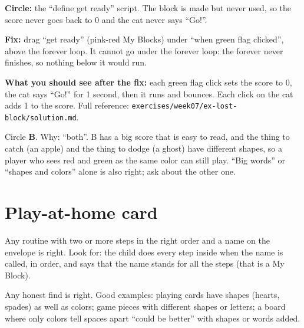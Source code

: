 \begin{answer}
\textbf{Circle:} the \enquote{define get ready} script. The block is made but never used, so the score never goes back to 0 and the cat never says \enquote{Go!}.

\textbf{Fix:} drag \enquote{get ready} (pink-red My Blocks) under \enquote{when green flag clicked}, above the forever loop. It cannot go under the forever loop: the forever never finishes, so nothing below it would run.

\textbf{What you should see after the fix:} each green flag click sets the score to 0, the cat says \enquote{Go!} for 1 second, then it runs and bounces. Each click on the cat adds 1 to the score. Full reference: \texttt{exercises/week07/ex-lost-block/solution.md}.
\end{answer}

\begin{answer}
Circle \textbf{B}. Why: \enquote{both}. B has a big score that is easy to read, and the thing to catch (an apple) and the thing to dodge (a ghost) have different shapes, so a player who sees red and green as the same color can still play. \enquote{Big words} or \enquote{shapes and colors} alone is also right; ask about the other one.
\end{answer}

\section{Play-at-home card}
\begin{answer}
Any routine with two or more steps in the right order and a name on the envelope is right. Look for: the child does every step inside when the name is called, in order, and says that the name stands for all the steps (that is a My Block).
\end{answer}

\begin{answer}
Any honest find is right. Good examples: playing cards have shapes (hearts, spades) as well as colors; game pieces with different shapes or letters; a board where only colors tell spaces apart \enquote{could be better} with shapes or words added.
\end{answer}
